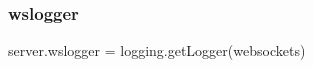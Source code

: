 \mbox{\label{namespaceserver_a520e79a10b246384fddda4381139cb5c}} 
\subsubsection{\texorpdfstring{wslogger}{wslogger}}
{\footnotesize\ttfamily server.\+wslogger = logging.\+get\+Logger(\textquotesingle{}websockets\textquotesingle{})}

